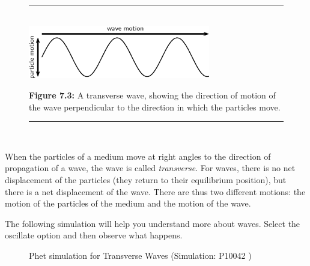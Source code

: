 	\begin{figure}[H] %
    \begin{center}
    \rule[.1in]{\figurerulewidth}{.005in} \\
        \label{m38806*uid7!!!underscore!!!media}\label{m38806*uid7!!!underscore!!!printimage}\includegraphics[width=300px]{col11305.imgs/m38806_PG10C5_003.png} %
      \vspace{2pt}
    \vspace{\rubberspace}\par \begin{cnxcaption}
	  \small \textbf{Figure 7.3: }A transverse wave, showing the direction of motion of the wave perpendicular to the direction in which the particles move.
	\end{cnxcaption}
    \vspace{.1in}
    \rule[.1in]{\figurerulewidth}{.005in} \\
    \end{center}
 \end{figure}       
      \label{m38806*id317903}When the particles of a medium move at right angles to the direction of propagation of a wave, the wave is called \textsl{transverse}. For waves, there is no net displacement of the particles (they return to their equilibrium position), but there is a net displacement of the wave. There are thus two different motions: the motion of the particles of the medium and the motion of the wave.\par 
      \label{m38806*eip-375}The following simulation will help you understand more about waves. Select the oscillate option and then observe what happens.
    \setcounter{subfigure}{0}
	\begin{figure}[H] %
    \textnormal{Phet simulation for Transverse Waves}\vspace{.1in} \nopagebreak
  \label{m38806*phet!!!underscore!!!sim}\label{m38806*phet-simulation}
             { (Simulation:  P10042 )}
      \vspace{2pt}
    \vspace{.1in}
 \end{figure}       \par \label{m38806*uid8}
